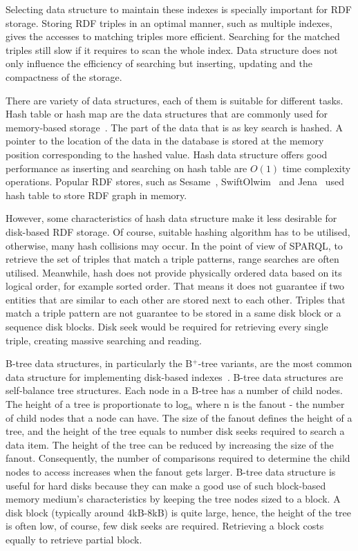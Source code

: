 {Selecting data structure to maintain these indexes is specially important for RDF storage.
Storing RDF triples in an optimal manner, such as multiple indexes, gives the accesses to matching triples more efficient.
Searching for the matched triples still slow if it requires to scan the whole index.
Data structure does not only influence the efficiency of searching but inserting, updating and the compactness of the storage.

There are variety of data structures, each of them is suitable for different tasks. 
Hash table or hash map are the data structures that are commonly used for memory-based storage~\citep{Date:1990}.
The part of the data that is as key search is hashed. 
A pointer to the location of the data in the database is stored at the memory position corresponding to the hashed value.
Hash data structure offers good performance as inserting and searching on hash table are $O(1)$ time complexity operations.
Popular RDF stores, such as Sesame~\citep{Wilkinson:2003}, SwiftOlwim~\citep{Ognyanoff:2007} and Jena~\citep{Seaborne:2010} used hash table to store RDF graph in memory.

However, some characteristics of hash data structure make it less desirable for disk-based RDF storage.
Of course, suitable hashing algorithm has to be utilised, otherwise, many hash collisions may occur.
In the point of view of SPARQL, to retrieve the set of triples that match a triple patterns, range searches are often utilised.
Meanwhile, hash does not provide physically ordered data based on its logical order, for example sorted order. 
That means it does not guarantee if two entities that are similar to each other are stored next to each other.
Triples that match a triple pattern are not guarantee to be stored in a same disk block or a sequence disk blocks.
Disk seek would be required for retrieving every single triple, creating massive searching and reading.

B-tree data structures, in particularly the B$^+$-tree variants, are the most common data structure for implementing disk-based indexes~\citep{Comer:1979}.
B-tree data structures are self-balance tree structures.
Each node in a B-tree has a number of child nodes.
The height of a tree is proportionate to log$_{n}$ where n is the fanout - the number of child nodes that a node can have.
The size of the fanout defines the height of a tree, and the height of the tree equals to number disk seeks required to search a data item. 
The height of the tree can be reduced by increasing the size of the fanout.
Consequently, the number of comparisons required to determine the child nodes to access increases when the fanout gets larger.
B-tree data structure is useful for hard disks because they can make a good use of such block-based memory medium's characteristics by keeping the tree nodes sized to a block.
A disk block (typically around 4kB-8kB) is quite large, hence, the height of the tree is often low, of course, few disk seeks are required. 
Retrieving a block costs equally to retrieve partial block.

}
